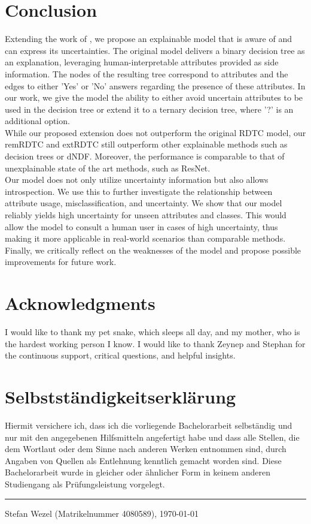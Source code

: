 \documentclass[a4paper,cleardoubleempty,BCOR1cm, 11pt]{report}
\begin{document}
\chapter{Conclusion}
Extending the work of \citet{alaniz2019explainable}, we propose an explainable model that is aware of and can express its uncertainties. The original model delivers a binary decision tree as an explanation, leveraging human-interpretable attributes provided as side information. The nodes of the resulting tree correspond to attributes and the edges to either 'Yes' or 'No' answers regarding the presence of these attributes. In our work, we give the model the ability to either avoid uncertain attributes to be used in the decision tree or extend it to a ternary decision tree, where '?' is an additional option.\\
While our proposed extension does not outperform the original RDTC model, our remRDTC and extRDTC still outperform other explainable methods such as decision trees or dNDF. Moreover, the performance is comparable to that of unexplainable state of the art methods, such as ResNet.\\
Our model does not only utilize uncertainty information but also allows introspection. We use this to further investigate the relationship between attribute usage, misclassification, and uncertainty.
We show that our model reliably yields high uncertainty for unseen attributes and classes. This would allow the model to consult a human user in cases of high uncertainty, thus making it more applicable in real-world scenarios than comparable methods.
Finally, we critically reflect on the weaknesses of the model and propose possible improvements for future work.









\chapter*{Acknowledgments}
I would like to thank my pet snake, which sleeps all day, and my mother, who is the hardest working person I know. I would like to thank Zeynep and Stephan for the continuous support, critical questions, and helpful insights.



\chapter*{Selbstst\"andigkeitserkl\"arung}
Hiermit versichere ich, dass ich die vorliegende Bachelorarbeit selbst\"andig und
nur mit den angegebenen Hilfsmitteln angefertigt habe und dass alle Stellen,
die dem Wortlaut oder dem Sinne nach anderen Werken entnommen sind,
durch Angaben von Quellen als Entlehnung kenntlich gemacht worden sind.
Diese Bachelorarbeit wurde in gleicher oder \"ahnlicher Form in keinem anderen
Studiengang als Pr\"ufungsleistung vorgelegt.

\vspace*{8ex}
\hrule
\vspace*{2ex}
Stefan Wezel (Matrikelnummer 4080589), \today
\end{document}

